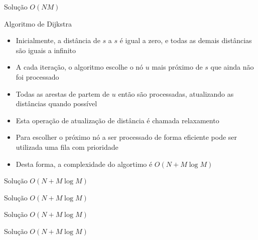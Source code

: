 \begin{frame}[fragile]{Solução $O(NM)$}
\end{frame}

\begin{frame}[fragile]{Algoritmo de Dijkstra}

    \begin{itemize}
        \item Inicialmente, a distância de $s$ a $s$ é igual a zero, e todas as demais
            distâncias são iguais a infinito

        \item A cada iteração, o algoritmo escolhe o nó $u$ mais próximo de $s$ que ainda não foi
            processado

        \item Todas as arestas de partem de $u$ então são processadas, atualizando as 
            distâncias quando possível

        \item Esta operação de atualização de distância é chamada relaxamento

        \item Para escolher o próximo nó a ser processado de forma eficiente pode ser utilizada uma
            fila com prioridade

        \item Desta forma, a complexidade do algortimo é $O(N + M\log M)$

    \end{itemize}

\end{frame}



\begin{frame}[fragile]{Solução $O(N + M\log M)$}
\end{frame}

\begin{frame}[fragile]{Solução $O(N + M\log M)$}
\end{frame}

\begin{frame}[fragile]{Solução $O(N + M\log M)$}
\end{frame}

\begin{frame}[fragile]{Solução $O(N + M\log M)$}
\end{frame}
